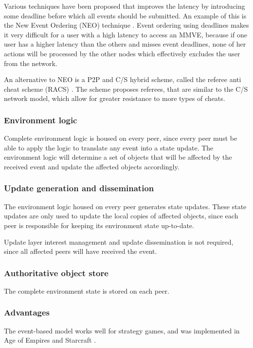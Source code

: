 Various techniques have been proposed that improves the latency by introducing some deadline before which all events should be submitted. An example of this is the New Event Ordering (NEO) technique \cite{cheat_proof_event_ordering}. Event ordering using deadlines makes it very difficult for a user with a high latency to access an MMVE, because if one user has a higher latency than the others and misses event deadlines, none of her actions will be processed by the other nodes which effectively excludes the user from the network.

An alternative to NEO is a P2P and C/S hybrid scheme, called the referee anti cheat scheme (RACS) \cite{cheating_taxonomy}. The scheme proposes referees, that are similar to the C/S network model, which allow for greater resistance to more types of cheats.

\subsubsection{Environment logic}
Complete environment logic is housed on every peer, since every peer must be able to apply the logic to translate any event into a state update. The environment logic will determine a set of objects that will be affected by the received event and update the affected objects accordingly.

\subsubsection{Update generation and dissemination}

The environment logic housed on every peer generates state updates. These state updates are only used to update the local copies of affected objects, since each peer is responsible for keeping its environment state up-to-date.

Update layer interest management and update dissemination is not required, since all affected peers will have received the event.

\subsubsection{Authoritative object store}

The complete environment state is stored on each peer.

\subsubsection{Advantages}
The event-based model works well for strategy games, and was implemented in Age of Empires \cite{p2p_cm_aoe} and Starcraft \cite{starcraft_network_model}.

